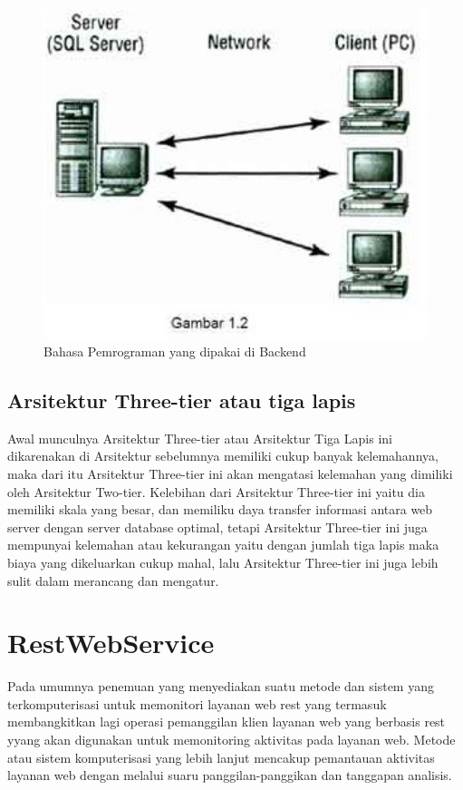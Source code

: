{\begin{figure}[ht]
    \centerline{\includegraphics[width=1\textwidth]{figures/2model2tier}}
    \caption{Bahasa Pemrograman yang dipakai di Backend}
    \label{2Tier2}
\end{figure}

\subsection{Arsitektur Three-tier atau tiga lapis}
Awal munculnya Arsitektur Three-tier atau Arsitektur Tiga Lapis ini dikarenakan di Arsitektur sebelumnya memiliki cukup banyak
kelemahannya, maka dari itu Arsitektur Three-tier ini akan mengatasi kelemahan yang dimiliki oleh Arsitektur Two-tier. Kelebihan
dari Arsitektur Three-tier ini yaitu dia memiliki skala yang besar, dan memiliku daya transfer informasi antara web server dengan 
server database optimal, tetapi Arsitektur Three-tier ini juga mempunyai kelemahan atau kekurangan yaitu dengan jumlah tiga lapis
maka biaya yang dikeluarkan cukup mahal, lalu Arsitektur Three-tier ini juga lebih sulit dalam merancang dan mengatur.

\section{RestWebService}
Pada umumnya penemuan yang menyediakan suatu metode dan sistem yang terkomputerisasi untuk memonitori layanan web rest yang termasuk membangkitkan lagi operasi pemanggilan klien layanan web yang berbasis rest yyang akan digunakan untuk memonitoring aktivitas pada layanan web. Metode atau sistem komputerisasi yang lebih lanjut mencakup pemantauan aktivitas layanan web dengan melalui suaru panggilan-panggikan dan tanggapan analisis.

}
